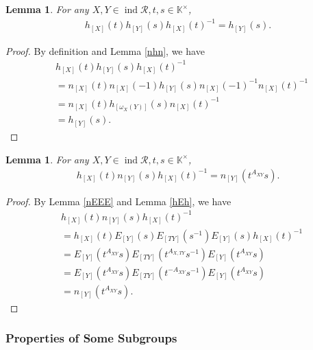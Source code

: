 \documentclass[12pt]{amsart}
\newtheorem{lemma}[theorem]{Lemma}
\begin{document}
\begin{lemma} \label{hhh}
    For any $X,Y \in \operatorname{ind}\mathcal{R},  t,s \in \mathbb{K}^{\times}$,
    \begin{align*}
        h_{[X]}(t) h_{[Y]}(s) h_{[X]}(t)^{-1} = h_{[Y]}(s).
    \end{align*}

\end{lemma}

\begin{proof}
    By definition and Lemma \ref{nhn}, we have 
    \begin{align*}
        &h_{[X]}(t) h_{[Y]}(s) h_{[X]}(t)^{-1} \\
        &= n_{[X]}(t) n_{[X]}(-1) h_{[Y]}(s) n_{[X]}(-1)^{-1} n_{[X]}(t)^{-1} \\
        &=  n_{[X]}(t) h_{[\omega_X(Y)]}(s) n_{[X]}(t)^{-1}\\
        &= h_{[Y]}(s).
    \end{align*}
\end{proof}


\begin{lemma}\label{hnh}
    For any  $X,Y \in \operatorname{ind}\mathcal{R},  t,s \in \mathbb{K}^{\times}$,
    \begin{align*}
        h_{[X]}(t) n_{[Y]}(s) h_{[X]}(t)^{-1} = n_{[Y]}(t^{A_{XY}}s).
    \end{align*}
    
\end{lemma}


\begin{proof}
    By Lemma \ref{nEEE} and Lemma \ref{hEh}, we have 
    \begin{align*}
        &h_{[X]}(t) n_{[Y]}(s) h_{[X]}(t)^{-1} \\
        &= h_{[X]}(t)  E_{[Y]}(s) E_{[TY]}(s^{-1}) E_{[Y]}(s)  h_{[X]}(t)^{-1} \\
        &= E_{[Y]}(t^{A_{XY}}s) E_{[TY]}(t^{A_{X,TY}}s^{-1}) E_{[Y]}(t^{A_{XY}}s) \\
        &= E_{[Y]}(t^{A_{XY}}s) E_{[TY]}(t^{-A_{XY}}s^{-1}) E_{[Y]}(t^{A_{XY}}s) \\
        &= n_{[Y]}(t^{A_{XY}}s).
    \end{align*}
\end{proof}



\subsubsection{Properties of Some Subgroups}
\end{document}
